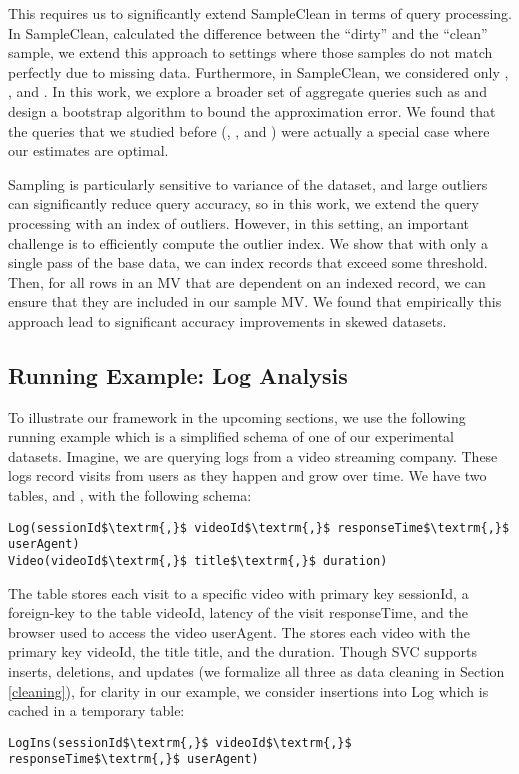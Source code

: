 This requires us to significantly extend SampleClean in terms of query processing.
In SampleClean, \nsc calculated the difference between the ``dirty'' and the ``clean'' sample, we extend this approach to settings where those samples do not match perfectly due to missing data.
Furthermore, in SampleClean, we considered only \sumfunc, \avgfunc, and \countfunc.
In this work, we explore a broader set of aggregate queries such as \medfunc and design a bootstrap algorithm to bound the approximation error.
We found that the queries that we studied before (\sumfunc, \avgfunc, and \countfunc) were actually a special case where our estimates are optimal.

Sampling is particularly sensitive to variance of the dataset, and large outliers can significantly reduce query accuracy, so in this work, we extend the query processing with an index of outliers.
However, in this setting, an important challenge is to efficiently compute the outlier index.
We show that with only a single pass of the base data, we can index records that exceed some threshold.
Then, for all rows in an MV that are dependent on an indexed record, we can ensure that they are included in our sample MV.
We found that empirically this approach lead to significant accuracy improvements in skewed datasets.

\subsection{Running Example: Log Analysis}
To illustrate our framework in the upcoming sections, we use the following running example which is a 
simplified schema of one of our experimental datasets.
Imagine, we are querying logs from a video streaming company. 
These logs record visits from users as they happen and grow over time.
We have two tables,  and , with the following schema:
\begin{lstlisting}[mathescape,basicstyle={\scriptsize}]
Log(sessionId$\textrm{,}$ videoId$\textrm{,}$ responseTime$\textrm{,}$ userAgent)
Video(videoId$\textrm{,}$ title$\textrm{,}$ duration)
\end{lstlisting}
The  table stores each visit to a specific video with primary key \textsf{sessionId}, a foreign-key to the  table \textsf{videoId}, latency of the visit \textsf{responseTime}, and the browser used to access the video \textsf{userAgent}.
The  stores each video with the primary key \textsf{videoId}, the title \textsf{title}, and the \textsf{duration}.
Though SVC supports inserts, deletions, and updates (we formalize all three as data cleaning in Section \ref{cleaning}), for clarity in our example, we consider insertions
into Log which is cached in a temporary table:
\begin{lstlisting}[mathescape,basicstyle={\scriptsize}]
LogIns(sessionId$\textrm{,}$ videoId$\textrm{,}$ responseTime$\textrm{,}$ userAgent)
\end{lstlisting}




